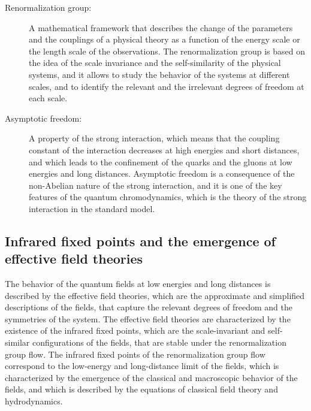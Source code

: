 \begin{tcolorbox}[colback=blue!5!white,colframe=blue!75!black,title=New terms]
    \begin{description}
        \item[Renormalization group:] A mathematical framework that describes the change of the parameters and the couplings of a physical theory as a function of the energy scale or the length scale of the observations. The renormalization group is based on the idea of the scale invariance and the self-similarity of the physical systems, and it allows to study the behavior of the systems at different scales, and to identify the relevant and the irrelevant degrees of freedom at each scale.
        \item[Asymptotic freedom:] A property of the strong interaction, which means that the coupling constant of the interaction decreases at high energies and short distances, and which leads to the confinement of the quarks and the gluons at low energies and long distances. Asymptotic freedom is a consequence of the non-Abelian nature of the strong interaction, and it is one of the key features of the quantum chromodynamics, which is the theory of the strong interaction in the standard model.
    \end{description}
\end{tcolorbox}

\subsection{Infrared fixed points and the emergence of effective field theories}
The behavior of the quantum fields at low energies and long distances is described by the effective field theories, which are the approximate and simplified descriptions of the fields, that capture the relevant degrees of freedom and the symmetries of the system. The effective field theories are characterized by the existence of the infrared fixed points, which are the scale-invariant and self-similar configurations of the fields, that are stable under the renormalization group flow. The infrared fixed points of the renormalization group flow correspond to the low-energy and long-distance limit of the fields, which is characterized by the emergence of the classical and macroscopic behavior of the fields, and which is described by the equations of classical field theory and hydrodynamics.


